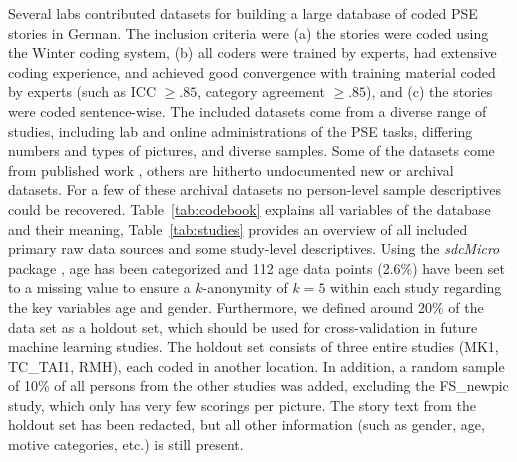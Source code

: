 \documentclass[man,a4paper,mask]{apa6}\usepackage[]{graphicx}\usepackage[]{color}
\begin{document}
Several labs contributed datasets for building a large database of coded PSE stories in German. The inclusion criteria were (a) the stories were coded using the Winter coding system, (b) all coders were trained by experts, had extensive coding experience, and achieved good convergence with training material coded by experts (such as ICC $\geq .85$, category agreement $\geq .85$), and (c) the stories were coded sentence-wise.
The included datasets come from a diverse range of studies, including lab and online administrations of the PSE tasks, differing numbers and types of pictures, and diverse samples. Some of the datasets come from published work \parencite[e.g.][]{schultheiss_ImplicitMotivesShow_2019,kollner_SocialBiopsychologyImplicit_2019,kollner_InfluenceImplicitMotives_2015,janson_InhibitedPowerMotivation_2018a,janson_ImplicitPowerMotive_2017,zygar_EinflussEmotionalerIntelligenz_2013,czikmantori_ExperienceIntrinsicMotivation_2018}, others are hitherto undocumented new or archival datasets. For a few of these archival datasets no person-level sample descriptives could be recovered. Table~\ref{tab:codebook} explains all variables of the database and their meaning, Table~\ref{tab:studies} provides an overview of all included primary raw data sources and some study-level descriptives. Using the \emph{sdcMicro} package \parencite{templ_StatisticalDisclosureControl_2015}, age has been categorized and 112 age data points (2.6\%) have been set to a missing value to ensure a $k$-anonymity of $k=5$ within each study regarding the key variables age and gender. Furthermore, we defined around 20\% of the data set as a holdout set, which should be used for cross-validation in future machine learning studies. The holdout set consists of three entire studies (MK1, TC\_TAI1, RMH), each coded in another location. In addition, a random sample of 10\% of all persons from the other studies was added, excluding the FS\_newpic study, which only has very few scorings per picture. The story text from the holdout set has been redacted, but all other information (such as gender, age, motive categories, etc.) is still present.
\end{document}
